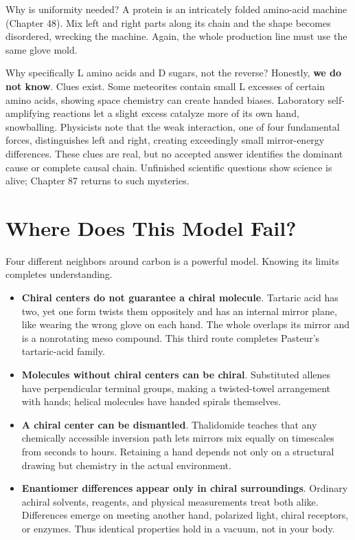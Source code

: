 Why is uniformity needed? A protein is an intricately folded amino-acid machine (Chapter 48). Mix left and right parts along its chain and the shape becomes disordered, wrecking the machine. Again, the whole production line must use the same glove mold.

Why specifically L amino acids and D sugars, not the reverse? Honestly, \textbf{we do not know}. Clues exist. Some meteorites contain small L excesses of certain amino acids, showing space chemistry can create handed biases. Laboratory self-amplifying reactions let a slight excess catalyze more of its own hand, snowballing. Physicists note that the weak interaction, one of four fundamental forces, distinguishes left and right, creating exceedingly small mirror-energy differences. These clues are real, but no accepted answer identifies the dominant cause or complete causal chain. Unfinished scientific questions show science is alive; Chapter 87 returns to such mysteries.

\section{Where Does This Model Fail?}

Four different neighbors around carbon is a powerful model. Knowing its limits completes understanding.

\begin{itemize}[itemsep=2pt]
\item \textbf{Chiral centers do not guarantee a chiral molecule}. Tartaric acid has two, yet one form twists them oppositely and has an internal mirror plane, like wearing the wrong glove on each hand. The whole overlaps its mirror and is a nonrotating meso compound. This third route completes Pasteur's tartaric-acid family.
\item \textbf{Molecules without chiral centers can be chiral}. Substituted allenes have perpendicular terminal groups, making a twisted-towel arrangement with hands; helical molecules have handed spirals themselves.
\item \textbf{A chiral center can be dismantled}. Thalidomide teaches that any chemically accessible inversion path lets mirrors mix equally on timescales from seconds to hours. Retaining a hand depends not only on a structural drawing but chemistry in the actual environment.
\item \textbf{Enantiomer differences appear only in chiral surroundings}. Ordinary achiral solvents, reagents, and physical measurements treat both alike. Differences emerge on meeting another hand, polarized light, chiral receptors, or enzymes. Thus identical properties hold in a vacuum, not in your body.
\end{itemize}


